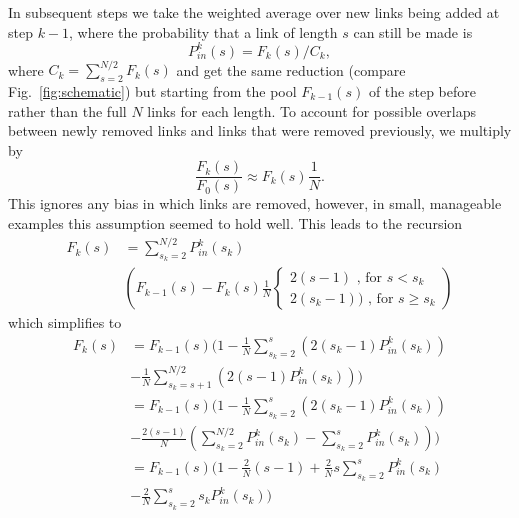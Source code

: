 \documentclass[
reprint,
twocolumn,
amsmath,amssymb,superscriptaddress,aps,
pre]{revtex4-1}
\begin{document}
In subsequent steps we take the weighted average over new links being added at step $k-1$, where the probability that a link of length $s$ can still be made is
\begin{equation}
    P_{in}^k(s)=F_k(s)/C_k,
\end{equation}
where $C_k=\sum_{s=2}^{N/2}F_k(s)$ and get the same reduction (compare Fig.~\ref{fig:schematic}) but starting from the pool $F_{k-1}(s)$ of the step before rather than the full $N$ links for each length. To account for possible overlaps between newly removed links and links that were removed previously, we multiply by
\begin{equation}
    \frac{F_k(s)}{F_0(s)} \approx F_k(s)\frac{1}{N}.
    \label{eq.Pk}
\end{equation}
This ignores any bias in which links are removed, however, in small, manageable examples this assumption seemed to hold well. 
This leads to the recursion
\begin{align}
    F_k(s)&= \sum_{s_k=2}^{N/2} P_{in}^k(s_k)\nonumber \\
    & (F_{k-1}(s)-  F_k(s)\frac{1}{N}
    {\begin{cases}
     2(s-1) \text{ , for } s<s_k\\
     2(s_k -1))\text{ , for } s\geq s_k
    \end{cases}} )
\end{align}
which simplifies to
\begin{align}
   F_k(s)&=F_{k-1}(s)(1-\frac{1}{N} \sum_{s_k=2}^{s} (2 (s_k-1) P_{in}^k(s_k))\nonumber \\
   &-\frac{1}{N} \sum_{s_k=s+1}^{N/2} (2 (s-1) P_{in}^k(s_k)))\nonumber \\
   &=F_{k-1}(s)(1-\frac{1}{N}
   \sum_{s_k=2}^{s} (2 (s_k-1) P_{in}^k(s_k))\nonumber \\
   &-\frac{2 (s-1)}{N} (\sum_{s_k=2}^{N/2} P_{in}^k(s_k) - \sum_{s_k=2}^{s} P_{in}^k(s_k)))\nonumber \\
   &=F_{k-1}(s)(1-\frac{2}{N} (s-1) 
   +\frac{2}{N} s
   \sum_{s_k=2}^{s}P_{in}^k(s_k)\nonumber \\
   &-\frac{2}{N}
   \sum_{s_k=2}^{s} s_k P_{in}^k(s_k))
   \label{eq.Fk_rec}
\end{align}
\end{document}
